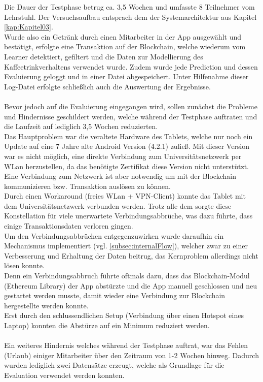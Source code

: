Die Dauer der Testphase betrug ca. 3,5 Wochen und umfasste 8 Teilnehmer vom Lehrstuhl. Der Versuchsaufbau entsprach dem der Systemarchitektur aus Kapitel \ref{kap:Kapitel03}. \\
Wurde also ein Getränk durch einen Mitarbeiter in der App ausgewählt und bestätigt, erfolgte eine Transaktion auf der Blockchain, welche wiederum vom Learner detektiert, gefiltert und die Daten zur Modellierung des Kaffeetrinkverhaltens verwendet wurde. Zudem wurde jede Prediction und dessen Evaluierung geloggt und in einer Datei abgespeichert. Unter Hilfenahme dieser Log-Datei erfolgte schließlich auch die Auswertung der Ergebnisse.\\\\
Bevor jedoch auf die Evaluierung eingegangen wird, sollen zunächst die Probleme und Hindernisse geschildert werden, welche während der Testphase auftraten und die Laufzeit auf lediglich 3,5 Wochen reduzierten.\\
Das Hauptproblem war die veraltete Hardware des Tablets, welche nur noch ein Update auf eine 7 Jahre alte Android Version (4.2.1) zuließ. Mit dieser Version war es nicht möglich, eine direkte Verbindung zum Universitätsnetzwerk per WLan herzustellen, da das benötigte Zertifikat diese Version nicht unterstützt. Eine Verbindung zum Netzwerk ist aber notwendig um mit der Blockchain kommunizieren bzw. Transaktion auslösen zu können. \\
Durch einen Workaround (freies WLan + VPN-Client) konnte das Tablet mit dem Universitätsnetzwerk verbunden werden. Trotz alle dem sorgte diese Konstellation für viele unerwartete Verbindungsabbrüche, was dazu führte, dass einige Transaktionsdaten verloren gingen. \\
Um den Verbindungsabbrüchen entgegenzuwirken wurde daraufhin ein Mechanismus implementiert (vgl. \ref{subsec:internalFlow}), welcher zwar zu einer Verbesserung und Erhaltung der Daten beitrug, das Kernproblem allerdings nicht lösen konnte. \\ 
Denn ein Verbindungsabbruch führte oftmals dazu, dass das Blockchain-Modul (Ethereum Library) der App abstürzte und die App manuell geschlossen und neu gestartet werden musste, damit wieder eine Verbindung zur Blockchain hergestellte werden konnte. \\
Erst durch den schlussendlichen Setup (Verbindung über einen Hotspot eines Laptop) konnten die Abstürze auf ein Minimum reduziert werden.\\\\
Ein weiteres Hindernis welches während der Testphase auftrat, war das Fehlen (Urlaub) einiger Mitarbeiter über den Zeitraum von 1-2 Wochen hinweg. Dadurch wurden lediglich zwei Datensätze erzeugt, welche als Grundlage für die Evaluation verwendet werden konnten. 


